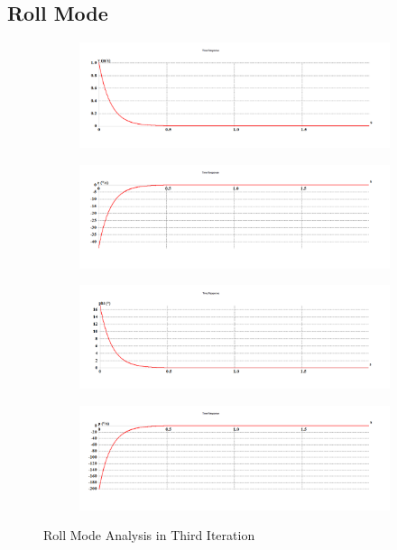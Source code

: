 \subsection{Roll Mode}
\begin{figure}[H]
\begin{subfigure}{0.48\textwidth}
\includegraphics[width = \linewidth]{v (1).png}
\end{subfigure}
\begin{subfigure}{0.48\textwidth}
\includegraphics[width = \linewidth]{r (1).png}
\end{subfigure}
\medskip
\begin{subfigure}{0.48\textwidth}
\includegraphics[width = \linewidth]{phi (1).png}
\end{subfigure}
\begin{subfigure}{0.48\textwidth}
\includegraphics[width = \linewidth]{p (1).png}
\end{subfigure}
\caption{Roll Mode Analysis in Third Iteration}
\end{figure}
